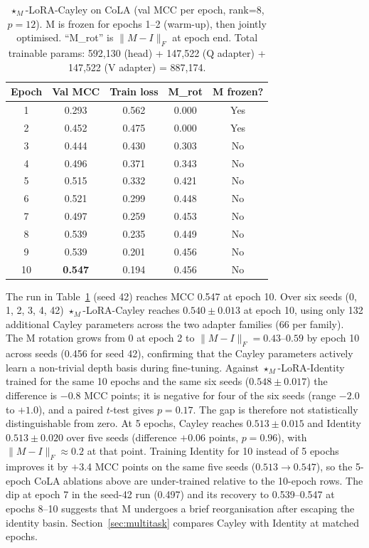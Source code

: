 \documentclass{article}
\theoremstyle{plain}
\begin{document}
\begin{table}[h]
\centering
\caption{$\star_M$-LoRA-Cayley on CoLA (val MCC per epoch, rank=8, $p=12$).
M is frozen for epochs 1--2 (warm-up), then jointly optimised.
``M\_rot'' is $\|M - I\|_F$ at epoch end.
Total trainable params: 592,130 (head) + 147,522 (Q adapter) + 147,522 (V adapter) = 887,174.}
\label{tab:cayley}
\begin{tabular}{ccccc}
\toprule
Epoch & Val MCC & Train loss & M\_rot & M frozen? \\
\midrule
1  & 0.293 & 0.562 & 0.000 & Yes \\
2  & 0.452 & 0.475 & 0.000 & Yes \\
3  & 0.444 & 0.430 & 0.303 & No \\
4  & 0.496 & 0.371 & 0.343 & No \\
5  & 0.515 & 0.332 & 0.421 & No \\
6  & 0.521 & 0.299 & 0.448 & No \\
7  & 0.497 & 0.259 & 0.453 & No \\
8  & 0.539 & 0.235 & 0.449 & No \\
9  & 0.539 & 0.201 & 0.456 & No \\
10 & \textbf{0.547} & 0.194 & 0.456 & No \\
\bottomrule
\end{tabular}
\end{table}

\noindent
The run in Table~\ref{tab:cayley} (seed 42) reaches MCC 0.547 at epoch 10.
Over six seeds (0, 1, 2, 3, 4, 42) $\star_M$-LoRA-Cayley reaches $0.540\pm0.013$ at epoch 10,
using only 132 additional Cayley parameters across the two adapter families (66 per family).
The M rotation grows from 0 at epoch 2 to $\|M-I\|_F = 0.43$--$0.59$ by epoch 10 across seeds
(0.456 for seed 42), confirming that the Cayley parameters actively learn a non-trivial depth
basis during fine-tuning.
Against $\star_M$-LoRA-Identity trained for the same 10 epochs and the same six seeds
($0.548\pm0.017$) the difference is $-0.8$ MCC points; it is negative for four of the six seeds
(range $-2.0$ to $+1.0$), and a paired $t$-test gives $p=0.17$.
The gap is therefore not statistically distinguishable from zero.
At 5 epochs, Cayley reaches $0.513\pm0.015$ and Identity $0.513\pm0.020$ over five seeds (difference $+0.06$ points,
$p=0.96$), with $\|M-I\|_F\approx0.2$ at that point.
Training Identity for 10 instead of 5 epochs improves it by $+$3.4 MCC points on the same five seeds
($0.513\to0.547$), so the 5-epoch CoLA ablations above are under-trained relative to the 10-epoch rows.
The dip at epoch 7 in the seed-42 run (0.497) and its recovery to 0.539--0.547 at epochs 8--10
suggests that M undergoes a brief reorganisation after escaping the identity basin.
Section~\ref{sec:multitask} compares Cayley with Identity at matched epochs.
\end{document}
